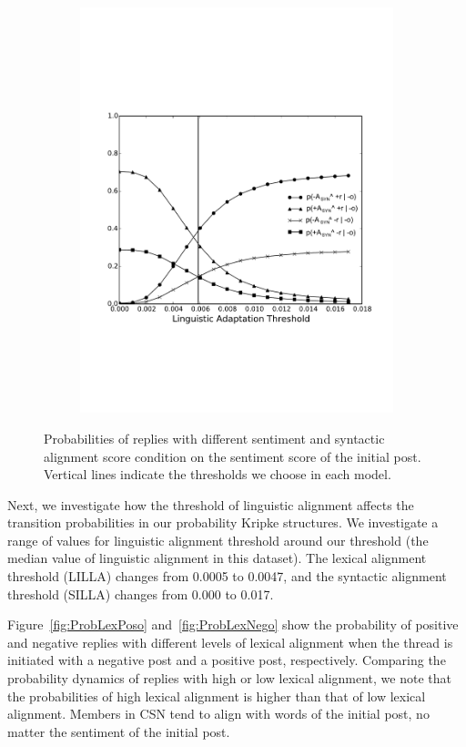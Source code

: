 \documentclass[man,biblatex,floatsintext]{apa6}
\newcommand{\up}{\vspace*{-12pt}}
\begin{document}
\begin{figure}[!htb]
\begin{subfigure}{.5\textwidth}
  \includegraphics[width=\linewidth]{Figures/SynAnegi_new_rob_New_Enlarge.pdf}
  \caption{\label{fig:ProbSynNego}}
\end{subfigure}%
\caption{Probabilities of replies with different sentiment and syntactic alignment score condition on the sentiment score of the initial post. Vertical lines indicate the thresholds we choose in each model.}
\label{fig:Probability_Change_Syn}
\up
\end{figure}


Next, we investigate how the threshold of linguistic alignment affects the transition probabilities in our probability Kripke structures. We investigate a range of values for linguistic alignment threshold around our threshold (the median value of linguistic alignment in this dataset). The lexical alignment threshold (LILLA) changes from 0.0005 to 0.0047, and the syntactic alignment threshold (SILLA) changes from 0.000 to 0.017.


Figure~\ref{fig:ProbLexPoso} and~\ref{fig:ProbLexNego} show the probability of positive and negative replies with different levels of lexical alignment when the thread is initiated with a negative post and a positive post, respectively. Comparing the probability dynamics of replies with high or low lexical alignment, we note that the probabilities of high lexical alignment is higher than that of low lexical alignment. Members in CSN tend to align with words of the initial post, no matter the sentiment of the initial post.
\end{document}
